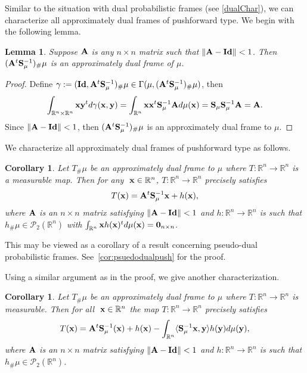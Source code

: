 \documentclass{amsart}
\numberwithin{equation}{section}
\theoremstyle{plain}
\newtheorem{lemma}[theorem]{Lemma}
\newtheorem{corollary}[theorem]{Corollary}
\theoremstyle{remark}
\theoremstyle{definition}
\begin{document}
Similar to the situation with dual probabilistic frames (see \cref{dualChar}), we can characterize all approximately dual frames of pushforward type. We begin with the following lemma.
\begin{lemma}
    Suppose $\bf A$ is any $n \times n$ matrix such that $\|{\bf A -Id} \| <1$. Then $({\bf A}^t{\bf S}_\mu^{-1})_\#\mu$ is an approximately dual frame of $\mu$. 
\end{lemma}
\begin{proof}
    Define $\gamma:= ({\bf Id}, {\bf A}^t{\bf S}_\mu^{-1})_\#\mu \in \Gamma(\mu, ({\bf A}^t{\bf S}_\mu^{-1})_\#\mu)$, then
    \begin{equation*}
        \int_{\mathbb{R}^n \times \mathbb{R}^n} {\bf x} {\bf y}^t d\gamma({\bf x, y}) = \int_{\mathbb{R}^n } {\bf x} {\bf x}^t {\bf S}_\mu^{-1} {\bf A} d\mu({\bf x}) ={\bf S}_\mu {\bf S}_\mu^{-1} {\bf A}  ={\bf A}.
    \end{equation*}
    Since $\|{\bf A -Id} \| <1$, then $({\bf A}^t{\bf S}_\mu^{-1})_\#\mu$ is an approximately dual frame to $\mu$. 
\end{proof}

 We characterize all approximately dual frames of pushforward type as follows.
 
\begin{corollary}\label{PushforwardCharacter}
    Let $T_\# \mu$ be an approximately dual frame to $\mu$ where $T: \mathbb{R}^n \rightarrow \mathbb{R}^n$ is a measurable map. Then for any $\ {\bf x} \in \mathbb{R}^n$, $T: \mathbb{R}^n \rightarrow \mathbb{R}^n$ precisely satisfies 
    \begin{equation*}
        T({\bf x}) = {\bf A}^t{\bf S}_\mu^{-1}{\bf x} + h({\bf x}),
    \end{equation*}
    where $\bf A$ is an $n \times n$ matrix satisfying $\|{\bf A -Id} \| <1$ and $h: \mathbb{R}^n \rightarrow \mathbb{R}^n$ is such that $h_\#\mu \in \mathcal{P}_2(\mathbb{R}^n)$ with $ \int_{\mathbb{R}^n } {\bf x} h({\bf x})^t d\mu({\bf x}) = {\bf 0}_{n \times n}$.
\end{corollary}
This may be viewed as a corollary of a result concerning pseudo-dual probabilistic frames.  See~\cref{cor:psuedodualpush} for the proof.

Using a similar argument as in the proof, we give another characterization.
\begin{corollary}
    Let $T_\# \mu$ be an approximately dual frame to $\mu$ where $T: \mathbb{R}^n \rightarrow \mathbb{R}^n$ is measurable. Then for all $\ {\bf x} \in \mathbb{R}^n$ the map $T: \mathbb{R}^n \rightarrow \mathbb{R}^n$ precisely satisfies  
    \begin{equation*}
        T({\bf x}) = {\bf A}^t{\bf S}_\mu^{-1}({\bf x}) + h({\bf x}) - \int_{\mathbb{R}^n} \langle {\bf S}_\mu^{-1}{\bf x}, {\bf y} \rangle h({\bf y}) d\mu({\bf y}),
      \end{equation*}
where $\bf A$ is an $n \times n$ matrix satisfying $\|{\bf A -Id} \| <1$ and $h: \mathbb{R}^n \rightarrow \mathbb{R}^n$ is such that $h_\#\mu \in \mathcal{P}_2(\mathbb{R}^n)$.
\end{corollary}
\end{document}
